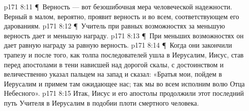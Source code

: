 \vs p171 8:11 \P\ \bibnobreakspace Верность --- вот безошибочная мера человеческой надежности. Верный в малом, вероятно, проявит верность и во всем, соответствующем его дарованиям.
\vs p171 8:12 \P\ \bibnobreakspace Учитель при равных возможностях за меньшую верность дает и меньшую награду.
\vs p171 8:13 \P\ \bibnobreakspace При меньших возможностях он дает равную награду за равную верность.
\vs p171 8:14 \P\ Когда они закончили трапезу и после того, как толпа последователей ушла в Иерусалим, Иисус, став перед апостолами в тени нависшей над дорогой скалы, с достоинством и величественно указал пальцем на запад и сказал: «Братья мои, пойдем в Иерусалим и примем там ожидающее нас; так мы во всем исполним волю Отца Небесного».
\vs p171 8:15 Итак, Иисус и его апостолы продолжили этот последний путь Учителя в Иерусалим в подобии плоти смертного человека.
